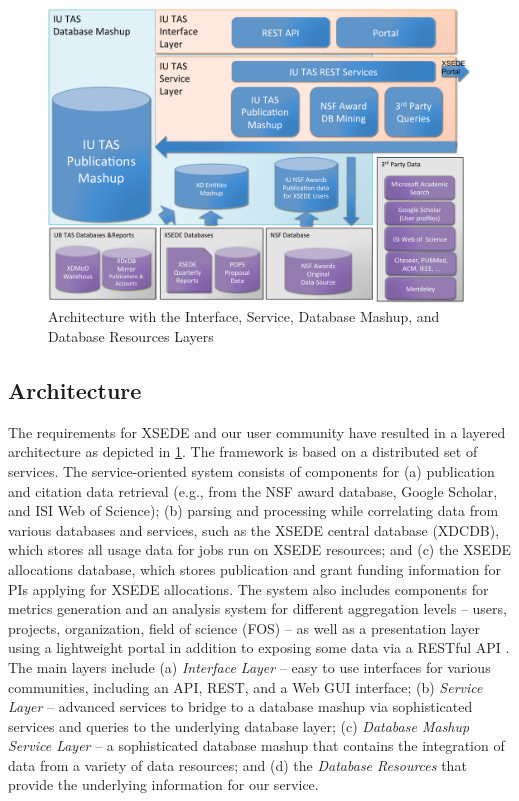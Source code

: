 \documentclass{sig-alternate}
\begin{document}
\begin{figure}[htb] 
  \centering 
    \includegraphics[width=1.0\columnwidth]{images-new/architecture.pdf} 
  \caption{Architecture with the Interface, Service, Database Mashup,
    and Database Resources Layers}\label{F:architecture} 
\end{figure} 



\subsection{Architecture}

The requirements for XSEDE and our user community have resulted in a layered architecture as depicted in \ref{F:architecture}.  The framework is based on a distributed set of services.  The service-oriented system consists of components for (a) publication and citation data retrieval (e.g., from the NSF award database, Google Scholar, and ISI Web of Science); (b) parsing and processing while correlating data from various databases and services, such as the XSEDE central database (XDCDB), which stores all usage data for jobs run on XSEDE resources; and (c) the XSEDE allocations database, which stores publication and grant funding information for PIs applying for XSEDE allocations.  The system also includes components for metrics generation and an analysis system for different aggregation levels -- users, projects, organization, field of science (FOS) -- as well as a presentation layer using a lightweight portal in addition to exposing some data via a RESTful API \cite{las14impact}.  The main layers include (a) {\em Interface Layer} -- easy to use interfaces for various communities, including an API, REST, and a Web GUI interface; (b) {\em Service Layer} -- advanced services to bridge to a database mashup via sophisticated services and queries to the underlying database layer; (c) {\em Database Mashup Service Layer} -- a sophisticated database mashup that contains the integration of data from a variety of data resources; and (d) the {\em Database Resources} that provide the underlying information for our service.
\end{document}
